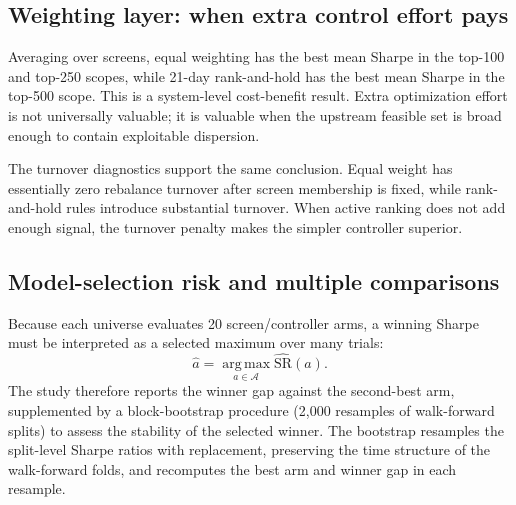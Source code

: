 \documentclass[journal,10pt]{IEEEtran}
\newcommand{\argmax}{\operatorname*{arg\,max}}
\begin{document}
\subsection{Weighting layer: when extra control effort pays}
Averaging over screens, equal weighting has the best mean Sharpe in the top-100 and top-250 scopes, while 21-day rank-and-hold has the best mean Sharpe in the top-500 scope. This is a system-level cost-benefit result. Extra optimization effort is not universally valuable; it is valuable when the upstream feasible set is broad enough to contain exploitable dispersion.
\begin{table}[!t]
\centering
\caption{Controller ablation: best weighting rule averaged over screens.}
\label{tab:controller_ablation_math}
\small
{}
\end{table}
The turnover diagnostics support the same conclusion. Equal weight has essentially zero rebalance turnover after screen membership is fixed, while rank-and-hold rules introduce substantial turnover. When active ranking does not add enough signal, the turnover penalty makes the simpler controller superior.

\subsection{Model-selection risk and multiple comparisons}
Because each universe evaluates 20 screen/controller arms, a winning Sharpe must be interpreted as a selected maximum over many trials:
\begin{equation}
\widehat{a} = \argmax_{a\in\mathcal{A}} \widehat{\text{SR}}(a).
\end{equation}
The study therefore reports the winner gap against the second-best arm, supplemented by a block-bootstrap procedure (2,000 resamples of walk-forward splits) to assess the stability of the selected winner. The bootstrap resamples the split-level Sharpe ratios with replacement, preserving the time structure of the walk-forward folds, and recomputes the best arm and winner gap in each resample.
\end{document}
